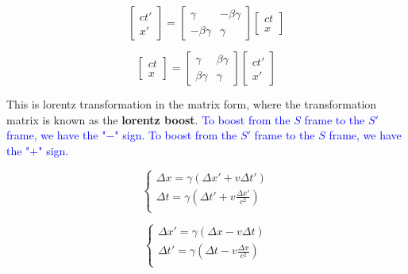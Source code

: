 \begin{multicols}{2}
    \begin{equation}
        \begin{bmatrix}
            ct' \\
            x'
        \end{bmatrix}
        =
        \begin{bmatrix}
            \gamma & -\beta \gamma \\
            -\beta \gamma & \gamma 
        \end{bmatrix}
        \begin{bmatrix}
            ct\\
            x 
        \end{bmatrix}
    \end{equation}\break


    \begin{equation}
        \begin{bmatrix}
            ct \\
            x
        \end{bmatrix}
        =
        \begin{bmatrix}
            \gamma & \beta \gamma \\
            \beta \gamma & \gamma 
        \end{bmatrix}
        \begin{bmatrix}
            ct'\\
            x'
        \end{bmatrix}
    \end{equation}
\end{multicols}

This is lorentz transformation in the matrix form, where the transformation matrix is known as the \textbf{lorentz boost}. \textcolor{blue}{To boost from the $S$ frame to the $S'$ frame, we have the "$-$" sign. To boost from the $S'$ frame to the $S$ frame, we have the "$+$" sign.}


\begin{equation}
    \begin{cases}
      \Delta x= \gamma (\Delta x' + v \Delta t') \\
      \Delta t= \gamma (\Delta t'+v \frac{\Delta x'}{c^2})\\
    \end{cases}      
\end{equation} 

\begin{equation}
    \begin{cases}
      \Delta x'= \gamma (\Delta x - v \Delta t) \\
      \Delta t'= \gamma (\Delta t - v \frac{\Delta x}{c^2})\\
    \end{cases}      
\end{equation} 

